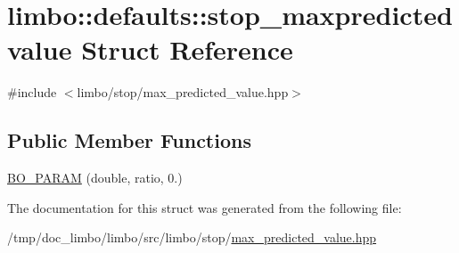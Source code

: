 \hypertarget{structlimbo_1_1defaults_1_1stop__maxpredictedvalue}{}\section{limbo\+:\+:defaults\+:\+:stop\+\_\+maxpredictedvalue Struct Reference}
\label{structlimbo_1_1defaults_1_1stop__maxpredictedvalue}


{\ttfamily \#include $<$limbo/stop/max\+\_\+predicted\+\_\+value.\+hpp$>$}

\subsection*{Public Member Functions}
\begin{DoxyCompactItemize}
\item 
\hyperlink{group__stop__defaults_ga65d82b10cd35e92f2df32c2dbed0f91b}{B\+O\+\_\+\+P\+A\+R\+AM} (double, ratio, 0.)
\end{DoxyCompactItemize}


The documentation for this struct was generated from the following file\+:\begin{DoxyCompactItemize}
\item 
/tmp/doc\+\_\+limbo/limbo/src/limbo/stop/\hyperlink{max__predicted__value_8hpp}{max\+\_\+predicted\+\_\+value.\+hpp}\end{DoxyCompactItemize}
